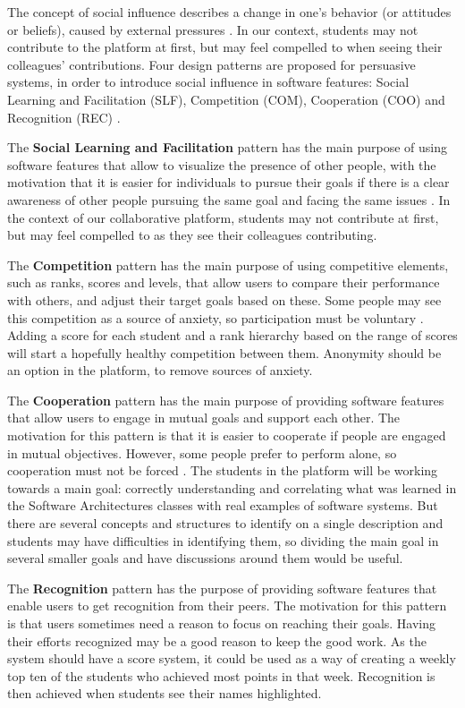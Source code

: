 \documentclass{llncs}
\begin{document}
The concept of social influence describes a change in one's behavior (or attitudes or beliefs), caused by external pressures \cite{guadagno2010preference}. In our context, students may not contribute to the platform at first, but may feel compelled to when seeing their colleagues' contributions. Four design patterns are proposed for persuasive systems, in order to introduce social influence in software features: Social Learning and Facilitation (SLF), Competition (COM), Cooperation (COO) and Recognition (REC) \cite{oduor2014persuasive}. 

The \textbf{Social Learning and Facilitation} pattern has the main purpose of using software features that allow to visualize the presence of other people, with the motivation that it is easier for individuals to pursue their goals if there is a clear awareness of other people pursuing the same goal and facing the same issues \cite{oduor2014persuasive}. In the context of our collaborative platform, students may not contribute at first, but may feel compelled to as they see their colleagues contributing.

The \textbf{Competition} pattern has the main purpose of using competitive elements, such as ranks, scores and levels, that allow users to compare their performance with others, and adjust their target goals based on these. Some people may see this competition as a source of anxiety, so participation must be voluntary \cite{oduor2014persuasive}. Adding a score for each student and a rank hierarchy based on the range of scores will start a hopefully healthy competition between them. Anonymity should be an option in the platform, to remove sources of anxiety.

The \textbf{Cooperation} pattern has the main purpose of providing software features that allow users to engage in mutual goals and support each other. The motivation for this pattern is that it is easier to cooperate if people are engaged in mutual objectives. However, some people prefer to perform alone, so cooperation must not be forced \cite{oduor2014persuasive}. The students in the platform will be working towards a main goal: correctly understanding and correlating what was learned in the Software Architectures classes with real examples of software systems. But there are several concepts and structures to identify on a single description and students may have difficulties in identifying them, so dividing the main goal in several smaller goals and have discussions around them would be useful.

The \textbf{Recognition} pattern has the purpose of providing software features that enable users to get recognition from their peers. The motivation for this pattern is that users sometimes need a reason to focus on reaching their goals. Having their efforts recognized may be a good reason to keep the good work\cite{oduor2014persuasive}. As the system should have a score system, it could be used as a way of creating a weekly top ten of the students who achieved most points in that week. Recognition is then achieved when students see their names highlighted.
\end{document}
